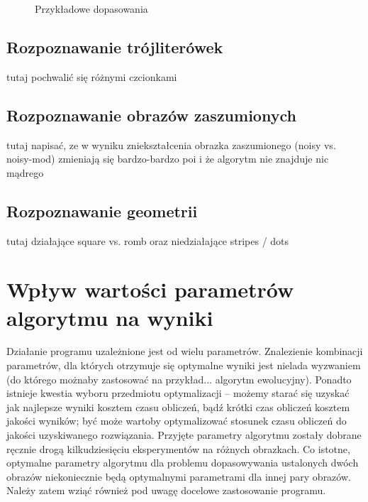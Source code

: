 \documentclass[a4paper,12pt,leqno]{article}
\begin{document}
\begin{figure}
\caption{Przykładowe dopasowania}\label{matches}
\end{figure}

\subsection{Rozpoznawanie trójliterówek}
tutaj pochwalić się różnymi czcionkami

\subsection{Rozpoznawanie obrazów zaszumionych}
tutaj napisać, ze w wyniku zniekształcenia obrazka zaszumionego (noisy vs. noisy-mod) zmieniają się bardzo-bardzo poi i że algorytm nie znajduje nic mądrego

\subsection{Rozpoznawanie geometrii}
tutaj działające square vs. romb oraz niedziałające stripes / dots


\section{Wpływ wartości parametrów algorytmu na wyniki}

Działanie programu uzależnione jest od wielu parametrów. Znalezienie kombinacji parametrów, dla których otrzymuje się optymalne wyniki jest nielada
wyzwaniem (do którego możnaby zastosować na przykład... algorytm ewolucyjny). Ponadto istnieje kwestia wyboru przedmiotu optymalizacji -- możemy starać
się uzyskać jak najlepsze wyniki kosztem czasu obliczeń, bądź krótki czas obliczeń kosztem jakości wyników; być może wartoby optymalizować stosunek
czasu obliczeń do jakości uzyskiwanego rozwiązania. Przyjęte parametry algorytmu zostały dobrane ręcznie drogą kilkudziesięciu eksperymentów na
różnych obrazkach. Co istotne, optymalne parametry algorytmu dla problemu dopasowywania ustalonych dwóch obrazów niekoniecznie będą optymalnymi
parametrami dla innej pary obrazów. Należy zatem wziąć również pod uwagę docelowe zastosowanie programu. 
\end{document}

